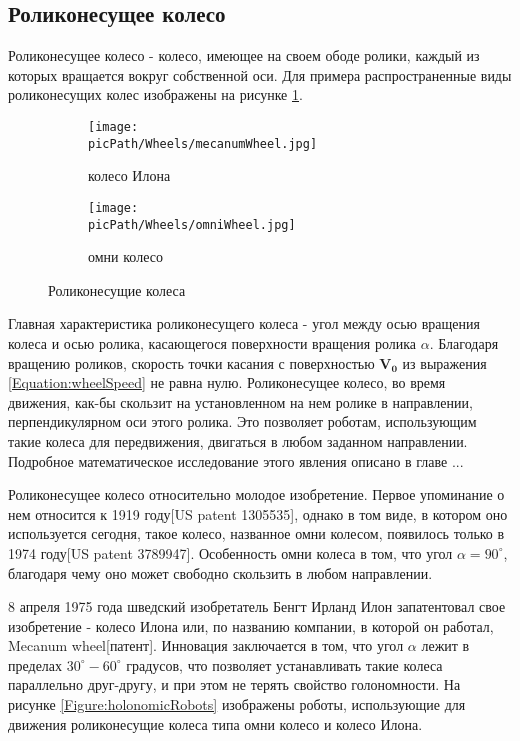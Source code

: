 \documentclass[oneside,final,14pt]{extreport}
\newcommand{\picPath}{img}
\newcommand{\bs}{\boldsymbol}
\begin{document}
\subsection{Роликонесущее колесо}
Роликонесущее колесо - колесо, имеющее на своем ободе ролики, каждый из которых вращается вокруг собственной оси. Для примера распространенные виды роликонесущих колес изображены на рисунке \ref{Figure:rollerHandedWheels}.
\begin{figure}[H]
  \centering
  \begin{subfigure}[b]{0.4\linewidth}
   \texttt{[image: \\picPath/Wheels/mecanumWheel.jpg]}
    \caption{ колесо Илона }
  \end{subfigure}
  \begin{subfigure}[b]{0.4\linewidth}
    \texttt{[image: \\picPath/Wheels/omniWheel.jpg]}
    \caption{ омни колесо }
  \end{subfigure}
  \caption{ Роликонесущие колеса}
  \label{Figure:rollerHandedWheels}
\end{figure}
Главная характеристика роликонесущего колеса - угол между осью вращения колеса и  осью ролика, касающегося поверхности вращения ролика $\alpha$. Благодаря вращению роликов, скорость точки касания с поверхностью $\bs{V_{0}}$ из выражения \ref{Equation:wheelSpeed} не равна нулю. Роликонесущее колесо, во время движения, как-бы скользит на установленном на нем ролике в направлении, перпендикулярном оси этого ролика. Это позволяет роботам, использующим такие колеса для передвижения, двигаться в любом заданном направлении. Подробное математическое исследование этого явления описано в главе ...

Роликонесущее колесо относительно молодое изобретение. Первое упоминание о нем относится к 1919 году[US patent 1305535], однако в том виде, в котором оно используется сегодня, такое колесо, названное омни колесом, появилось только в	1974 году[US patent 3789947]. Особенность омни колеса в том, что угол $\alpha = 90^{\circ}$, благодаря чему оно может свободно скользить в любом направлении.

8 апреля 1975 года шведский изобретатель Бенгт Ирланд Илон запатентовал свое изобретение - колесо Илона или, по названию компании, в которой он работал, Mecanum wheel[патент]. Инновация заключается в том, что   угол $\alpha$  лежит в пределах $30^{\circ}-60^{\circ}$  градусов, что позволяет устанавливать такие колеса параллельно друг-другу, и при этом не терять свойство голономности. На рисунке \ref{Figure:holonomicRobots} изображены роботы, использующие для движения роликонесущие колеса типа омни колесо и колесо Илона.
\end{document}
